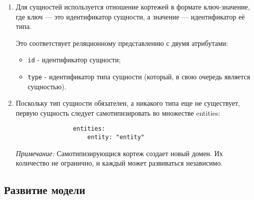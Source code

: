 \documentclass[final]{article}
\begin{document}
            \begin{enumerate}

                \item Для сущностей используется отношение кортежей в формате 
                ключ-значение, где ключ — это идентификатор сущности, а значение — 
                идентификатор её типа. 

                Это соответствует реляционному представлению с двумя атрибутами:

                \begin{itemize}
                    \item \texttt{id} - идентификатор сущности;
                    \item \texttt{type} - идентификатор типа сущности (который, в свою 
                    очередь является сущностью).
                \end{itemize}
                
                \item Поскольку тип сущности обязателен, а никакого типа еще не 
                существует, первую сущность следует самотипизировать во 
                множестве entities:

                \begin{verbatim}
                entities:
                    entity: "entity"
                \end{verbatim}


                \textit{Примечание:} Самотипизирующися кортеж создает новый домен. 
                Их количество не огранично, и каждый может развиваться независимо.

            \end{enumerate}

    \subsection{Развитие модели}
\end{document}
